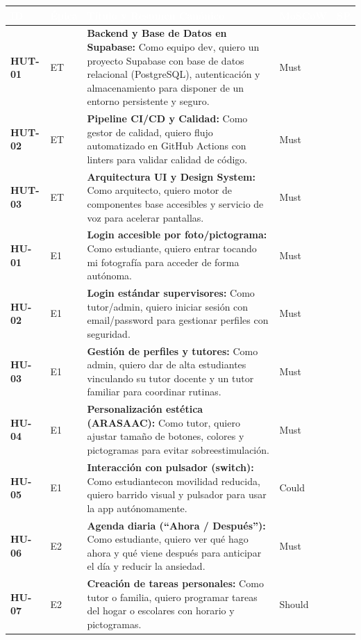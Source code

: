 \documentclass[11pt,a4paper]{article}
\begin{document}
{\small
\begin{longtable}{|>{\centering\bfseries\arraybackslash}p{1.3cm}|>{\centering\arraybackslash}p{1.1cm}|>{\raggedright\arraybackslash}p{7.4cm}|>{\centering\arraybackslash}p{1.6cm}|>{\centering\arraybackslash}p{0.8cm}|}
\hline
\rowcolor{gblue}\textcolor{white}{\textbf{ID}} & \textcolor{white}{\textbf{Épica}} & \textcolor{white}{\textbf{Título y Resumen Canónico}} & \textcolor{white}{\textbf{MoSCoW}} & \textcolor{white}{\textbf{SP}} \\ \hline
\endhead
HUT-01 & ET & \textbf{Backend y Base de Datos en Supabase:} Como equipo dev, quiero un proyecto Supabase con base de datos relacional (PostgreSQL), autenticación y almacenamiento para disponer de un entorno persistente y seguro. & Must & 3 \\ \hline
HUT-02 & ET & \textbf{Pipeline CI/CD y Calidad:} Como gestor de calidad, quiero flujo automatizado en GitHub Actions con linters para validar calidad de código. & Must & 2 \\ \hline
HUT-03 & ET & \textbf{Arquitectura UI y Design System:} Como arquitecto, quiero motor de componentes base accesibles y servicio de voz para acelerar pantallas. & Must & 3 \\ \hline
HU-01 & E1 & \textbf{Login accesible por foto/pictograma:} Como estudiante, quiero entrar tocando mi fotografía para acceder de forma autónoma. & Must & 3 \\ \hline
HU-02 & E1 & \textbf{Login estándar supervisores:} Como tutor/admin, quiero iniciar sesión con email/password para gestionar perfiles con seguridad. & Must & 2 \\ \hline
HU-03 & E1 & \textbf{Gestión de perfiles y tutores:} Como admin, quiero dar de alta estudiantes vinculando su tutor docente y un tutor familiar para coordinar rutinas. & Must & 3 \\ \hline
HU-04 & E1 & \textbf{Personalización estética (ARASAAC):} Como tutor, quiero ajustar tamaño de botones, colores y pictogramas para evitar sobreestimulación. & Must & 3 \\ \hline
HU-05 & E1 & \textbf{Interacción con pulsador (switch):} Como estudiantecon movilidad reducida, quiero barrido visual y pulsador para usar la app autónomamente. & Could & 5 \\ \hline
HU-06 & E2 & \textbf{Agenda diaria (``Ahora / Después''):} Como estudiante, quiero ver qué hago ahora y qué viene después para anticipar el día y reducir la ansiedad. & Must & 5 \\ \hline
HU-07 & E2 & \textbf{Creación de tareas personales:} Como tutor o familia, quiero programar tareas del hogar o escolares con horario y pictogramas. & Should & 3 \\ \hline

\end{longtable}}
\end{document}
